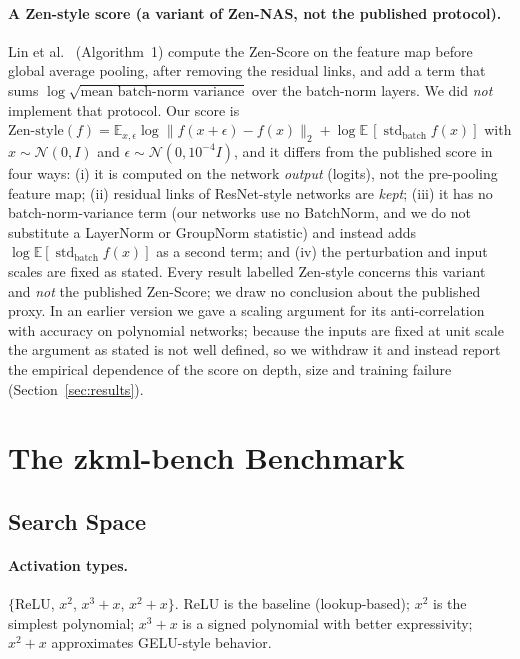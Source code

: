 \documentclass[10pt]{article}
\begin{document}
\paragraph{A Zen-style score (a variant of Zen-NAS, not the published protocol).}
Lin et al.~\citep{lin2021zen} (Algorithm~1) compute the Zen-Score on the feature map before global average pooling, after removing the residual links, and add a term that sums
$\log\sqrt{\text{mean batch-norm variance}}$ over the batch-norm layers.  We did \emph{not} implement that protocol.  Our score is
$\mathrm{Zen\text{-}style}(f)=\mathbb{E}_{x,\epsilon}\log\|f(x+\epsilon)-f(x)\|_2+\log\mathbb{E}\,[\operatorname{std}_{\text{batch}} f(x)]$ with $x\sim\mathcal{N}(0,I)$ and
$\epsilon\sim\mathcal{N}(0,10^{-4}I)$, and it differs from the published score in four ways: (i) it is computed on the network \emph{output} (logits), not the pre-pooling feature map; (ii) residual links of ResNet-style networks are \emph{kept};
(iii) it has no batch-norm-variance term (our networks use no BatchNorm, and we do not substitute a LayerNorm or GroupNorm statistic) and instead adds $\log\mathbb{E}[\operatorname{std}_{\text{batch}}f(x)]$ as a second term; and (iv) the perturbation and input scales are fixed as stated.
Every result labelled Zen-style concerns this variant and \emph{not} the published Zen-Score; we draw no conclusion about the published proxy.  In an earlier version we gave a scaling argument for its
anti-correlation with accuracy on polynomial networks; because the inputs are fixed at unit
scale the argument as stated is not well defined, so we withdraw it and instead report the
empirical dependence of the score on depth, size and training failure (Section~\ref{sec:results}).


\section{The zkml-bench Benchmark}
\label{sec:benchmark}

\subsection{Search Space}

\paragraph{Activation types.}
$\{$ReLU, $x^2$, $x^3{+}x$, $x^2{+}x\}$.  ReLU is the baseline (lookup-based);
$x^2$ is the simplest polynomial; $x^3{+}x$ is a signed
polynomial with better expressivity; $x^2{+}x$ approximates GELU-style
behavior.
\end{document}
